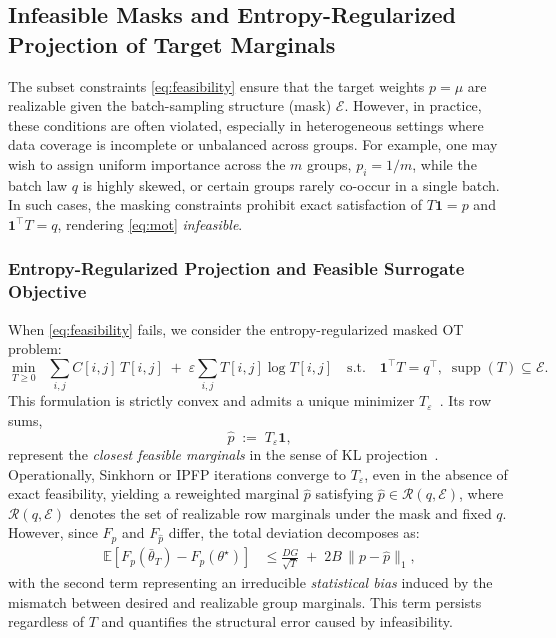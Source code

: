 \documentclass[9pt]{extarticle}
\theoremstyle{definition}
\begin{document}
\subsection{Infeasible Masks and Entropy-Regularized Projection of Target Marginals}
\label{subsec:infeasible}
The subset constraints \eqref{eq:feasibility} ensure that the target weights $p=\mu$ are realizable given the batch-sampling structure (mask) $\mathcal{E}$.
However, in practice, these conditions are often violated, especially in heterogeneous settings where data coverage is incomplete or unbalanced across groups.
For example, one may wish to assign uniform importance across the $m$ groups, $p_i = 1/m$, while the batch law $q$ is highly skewed, or certain groups rarely co-occur in a single batch.
In such cases, the masking constraints prohibit exact satisfaction of $T\mathbf{1}=p$ and $\mathbf{1}^\top T=q$, rendering \eqref{eq:mot} \emph{infeasible}.
\subsubsection{Entropy-Regularized Projection and Feasible Surrogate Objective}
When \eqref{eq:feasibility} fails, we consider the entropy-regularized masked OT problem:
\begin{equation}\label{eq:entropic-mot-failure}
\min_{T\ge 0}\;\;\sum_{i,j} C[i,j]\,T[i,j] \;+\; \varepsilon \sum_{i,j} T[i,j]\log T[i,j]
\quad\text{s.t.}\quad \mathbf{1}^\top T=q^\top,\;\operatorname{supp}(T)\subseteq\mathcal{E}.
\end{equation}
This formulation is strictly convex and admits a unique minimizer $T_\varepsilon$~\cite{cuturi2013sinkhorn,peyre2019computational}.
Its row sums,
\begin{equation}\label{eq:phat-failure}
\hat{p} \;:=\; T_\varepsilon \mathbf{1},
\end{equation}
represent the \emph{closest feasible marginals} in the sense of KL projection~\cite{csiszar1975ipr}.
Operationally, Sinkhorn or IPFP iterations converge to $T_\varepsilon$, even in the absence of exact feasibility, yielding a reweighted marginal $\hat{p}$ satisfying $\hat{p}\in\mathcal{R}(q,\mathcal{E})$, where $\mathcal{R}(q,\mathcal{E})$ denotes the set of realizable row marginals under the mask and fixed $q$.
However, since $F_p$ and $F_{\hat{p}}$ differ, the total deviation decomposes as:
\begin{align}
\mathbb{E}\!\left[F_p(\bar{\theta}_T) - F_p(\theta^\star)\right]
&\le \frac{DG}{\sqrt{T}} \;+\; 2B\,\|p-\hat{p}\|_1,
\label{eq:infeasible-rate}
\end{align}
with the second term representing an irreducible \emph{statistical bias} induced by the mismatch between desired and realizable group marginals.
This term persists regardless of $T$ and quantifies the structural error caused by infeasibility.
\end{document}
